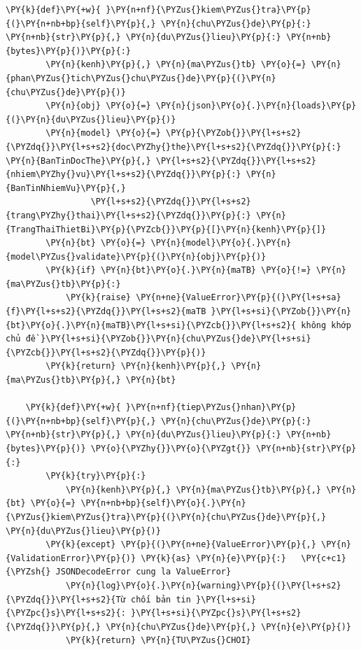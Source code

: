 \begin{Verbatim}[commandchars=\\\{\},frame=single,framerule=0.3pt,rulecolor=\color{black!40},fontsize=\footnotesize,breaklines=true]
    \PY{k}{def}\PY{+w}{ }\PY{n+nf}{\PYZus{}kiem\PYZus{}tra}\PY{p}{(}\PY{n+nb+bp}{self}\PY{p}{,} \PY{n}{chu\PYZus{}de}\PY{p}{:} \PY{n+nb}{str}\PY{p}{,} \PY{n}{du\PYZus{}lieu}\PY{p}{:} \PY{n+nb}{bytes}\PY{p}{)}\PY{p}{:}
        \PY{n}{kenh}\PY{p}{,} \PY{n}{ma\PYZus{}tb} \PY{o}{=} \PY{n}{phan\PYZus{}tich\PYZus{}chu\PYZus{}de}\PY{p}{(}\PY{n}{chu\PYZus{}de}\PY{p}{)}
        \PY{n}{obj} \PY{o}{=} \PY{n}{json}\PY{o}{.}\PY{n}{loads}\PY{p}{(}\PY{n}{du\PYZus{}lieu}\PY{p}{)}
        \PY{n}{model} \PY{o}{=} \PY{p}{\PYZob{}}\PY{l+s+s2}{\PYZdq{}}\PY{l+s+s2}{doc\PYZhy{}the}\PY{l+s+s2}{\PYZdq{}}\PY{p}{:} \PY{n}{BanTinDocThe}\PY{p}{,} \PY{l+s+s2}{\PYZdq{}}\PY{l+s+s2}{nhiem\PYZhy{}vu}\PY{l+s+s2}{\PYZdq{}}\PY{p}{:} \PY{n}{BanTinNhiemVu}\PY{p}{,}
                 \PY{l+s+s2}{\PYZdq{}}\PY{l+s+s2}{trang\PYZhy{}thai}\PY{l+s+s2}{\PYZdq{}}\PY{p}{:} \PY{n}{TrangThaiThietBi}\PY{p}{\PYZcb{}}\PY{p}{[}\PY{n}{kenh}\PY{p}{]}
        \PY{n}{bt} \PY{o}{=} \PY{n}{model}\PY{o}{.}\PY{n}{model\PYZus{}validate}\PY{p}{(}\PY{n}{obj}\PY{p}{)}
        \PY{k}{if} \PY{n}{bt}\PY{o}{.}\PY{n}{maTB} \PY{o}{!=} \PY{n}{ma\PYZus{}tb}\PY{p}{:}
            \PY{k}{raise} \PY{n+ne}{ValueError}\PY{p}{(}\PY{l+s+sa}{f}\PY{l+s+s2}{\PYZdq{}}\PY{l+s+s2}{maTB }\PY{l+s+si}{\PYZob{}}\PY{n}{bt}\PY{o}{.}\PY{n}{maTB}\PY{l+s+si}{\PYZcb{}}\PY{l+s+s2}{ không khớp chủ đề }\PY{l+s+si}{\PYZob{}}\PY{n}{chu\PYZus{}de}\PY{l+s+si}{\PYZcb{}}\PY{l+s+s2}{\PYZdq{}}\PY{p}{)}
        \PY{k}{return} \PY{n}{kenh}\PY{p}{,} \PY{n}{ma\PYZus{}tb}\PY{p}{,} \PY{n}{bt}

    \PY{k}{def}\PY{+w}{ }\PY{n+nf}{tiep\PYZus{}nhan}\PY{p}{(}\PY{n+nb+bp}{self}\PY{p}{,} \PY{n}{chu\PYZus{}de}\PY{p}{:} \PY{n+nb}{str}\PY{p}{,} \PY{n}{du\PYZus{}lieu}\PY{p}{:} \PY{n+nb}{bytes}\PY{p}{)} \PY{o}{\PYZhy{}}\PY{o}{\PYZgt{}} \PY{n+nb}{str}\PY{p}{:}
        \PY{k}{try}\PY{p}{:}
            \PY{n}{kenh}\PY{p}{,} \PY{n}{ma\PYZus{}tb}\PY{p}{,} \PY{n}{bt} \PY{o}{=} \PY{n+nb+bp}{self}\PY{o}{.}\PY{n}{\PYZus{}kiem\PYZus{}tra}\PY{p}{(}\PY{n}{chu\PYZus{}de}\PY{p}{,} \PY{n}{du\PYZus{}lieu}\PY{p}{)}
        \PY{k}{except} \PY{p}{(}\PY{n+ne}{ValueError}\PY{p}{,} \PY{n}{ValidationError}\PY{p}{)} \PY{k}{as} \PY{n}{e}\PY{p}{:}   \PY{c+c1}{\PYZsh{} JSONDecodeError cung la ValueError}
            \PY{n}{log}\PY{o}{.}\PY{n}{warning}\PY{p}{(}\PY{l+s+s2}{\PYZdq{}}\PY{l+s+s2}{Từ chối bản tin }\PY{l+s+si}{\PYZpc{}s}\PY{l+s+s2}{: }\PY{l+s+si}{\PYZpc{}s}\PY{l+s+s2}{\PYZdq{}}\PY{p}{,} \PY{n}{chu\PYZus{}de}\PY{p}{,} \PY{n}{e}\PY{p}{)}
            \PY{k}{return} \PY{n}{TU\PYZus{}CHOI}


\end{Verbatim}
